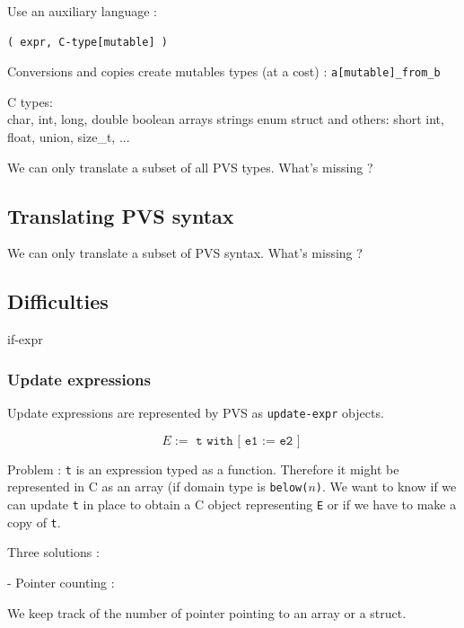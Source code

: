 \documentclass[12pt,a4paper,titlepage]{article}
\newcommand{\codeline}[1]{\texttt{#1}}
\begin{document}
Use an auxiliary language :

\begin{lstlisting}
( expr, C-type[mutable] )
\end{lstlisting}

Conversions and copies create mutables types (at a cost) :
\codeline{a[mutable]\_from\_b}









C types:\\
[unsigned] char, int, long, double
boolean
arrays
strings
enum
struct
and others: short int, float, union, size\_t, ...










We can only translate a subset of all PVS types.
What's missing ?

\subsection{Translating PVS syntax}


We can only translate a subset of PVS syntax.
What's missing ?



\subsection{Difficulties}
if-expr


\subsubsection{ Update expressions }
Update expressions are represented by PVS as \texttt{update-expr} objects.

$$ E := \texttt{ t with [ e1 := e2 ] } $$


Problem :
\codeline{t} is an expression typed as a function. Therefore it might be represented in C as an array (if domain type is \codeline{below($n$)}.
We want to know if we can update \codeline{t} in place to obtain a C object representing \codeline{E} or if we have to make a copy of \codeline{t}.

Three solutions :

- Pointer counting :

We keep track of the number of pointer pointing to an array or a struct.
\end{document}
